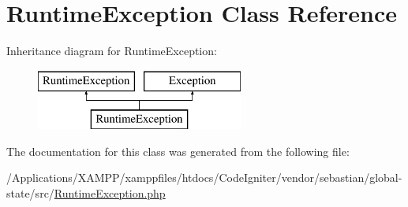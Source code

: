 \hypertarget{class_sebastian_bergmann_1_1_global_state_1_1_runtime_exception}{}\section{Runtime\+Exception Class Reference}
\label{class_sebastian_bergmann_1_1_global_state_1_1_runtime_exception}
Inheritance diagram for Runtime\+Exception\+:\begin{figure}[H]
\begin{center}
\leavevmode
\includegraphics[height=2.000000cm]{class_sebastian_bergmann_1_1_global_state_1_1_runtime_exception}
\end{center}
\end{figure}


The documentation for this class was generated from the following file\+:\begin{DoxyCompactItemize}
\item 
/\+Applications/\+X\+A\+M\+P\+P/xamppfiles/htdocs/\+Code\+Igniter/vendor/sebastian/global-\/state/src/\mbox{\hyperlink{sebastian_2global-state_2src_2_runtime_exception_8php}{Runtime\+Exception.\+php}}\end{DoxyCompactItemize}
